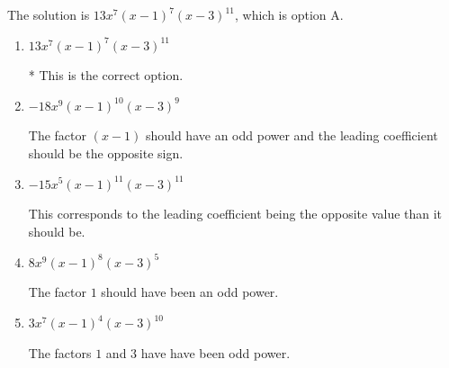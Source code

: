 \documentclass{extbook}[14pt]
\begin{document}
\begin{enumerate}
{The solution is \( 13x^{7} (x - 1)^{7} (x - 3)^{11} \), which is option A.\begin{enumerate}[label=\Alph*.]
\item \( 13x^{7} (x - 1)^{7} (x - 3)^{11} \)

* This is the correct option.
\item \( -18x^{9} (x - 1)^{10} (x - 3)^{9} \)

The factor $(x - 1)$ should have an odd power and the leading coefficient should be the opposite sign.
\item \( -15x^{5} (x - 1)^{11} (x - 3)^{11} \)

This corresponds to the leading coefficient being the opposite value than it should be.
\item \( 8x^{9} (x - 1)^{8} (x - 3)^{5} \)

The factor $1$ should have been an odd power.
\item \( 3x^{7} (x - 1)^{4} (x - 3)^{10} \)

The factors $1$ and $3$ have have been odd power.
\end{enumerate}

}
\end{enumerate}
\end{document}
